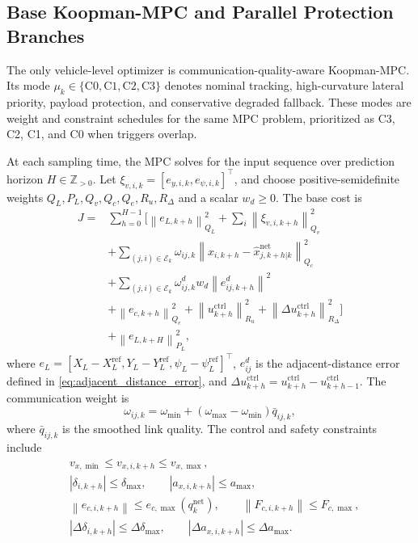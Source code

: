 \documentclass[letterpaper,journal]{IEEEtran}
\newcommand{\norm}[1]{\left\lVert #1 \right\rVert}
\begin{document}
\subsection{Base Koopman-MPC and Parallel Protection Branches}

The only vehicle-level optimizer is communication-quality-aware Koopman-MPC. Its mode $\mu_k\in\{\mathrm{C0},\mathrm{C1},\mathrm{C2},\mathrm{C3}\}$ denotes nominal tracking, high-curvature lateral priority, payload protection, and conservative degraded fallback. These modes are weight and constraint schedules for the same MPC problem, prioritized as C3, C2, C1, and C0 when triggers overlap.

At each sampling time, the MPC solves for the input sequence over prediction horizon $H\in\mathbb Z_{>0}$. Let $\xi_{v,i,k}=[e_{y,i,k},e_{\psi,i,k}]^\top$, and choose positive-semidefinite weights $Q_L,P_L,Q_v,Q_c,Q_e,R_u,R_\Delta$ and a scalar $w_d\ge0$. The base cost is
\begingroup\small
\begin{equation}
\begin{aligned}
J=&\sum_{h=0}^{H-1}
\Big[
\norm{e_{L,k+h}}_{Q_L}^2+
\sum_i\norm{\xi_{v,i,k+h}}_{Q_v}^2\\
&+\sum_{(j,i)\in\mathcal E_k}\omega_{ij,k}\norm{x_{i,k+h}-\hat x_{j,k+h|k}^{\mathrm{net}}}_{Q_c}^2\\
&+\sum_{(j,i)\in\mathcal E_k}\omega^d_{ij,k}w_d\norm{e^d_{ij,k+h}}^2\\
&+\norm{e_{c,k+h}}_{Q_e}^2+
\norm{u_{k+h}^{\mathrm{ctrl}}}_{R_u}^2+
\norm{\Delta u_{k+h}^{\mathrm{ctrl}}}_{R_\Delta}^2
\Big]\\
&+\norm{e_{L,k+H}}_{P_L}^2 ,
\end{aligned}
\label{eq:mpc_cost}
\end{equation}
\endgroup
where $e_L=[X_L-X_L^{\mathrm{ref}},Y_L-Y_L^{\mathrm{ref}},\psi_L-\psi_L^{\mathrm{ref}}]^\top$, $e^d_{ij}$ is the adjacent-distance error defined in \eqref{eq:adjacent_distance_error}, and $\Delta u_{k+h}^{\mathrm{ctrl}}=u_{k+h}^{\mathrm{ctrl}}-u_{k+h-1}^{\mathrm{ctrl}}$. The communication weight is
\begin{equation}
\omega_{ij,k}=\omega_{\min}+(\omega_{\max}-\omega_{\min})\bar q_{ij,k},
\label{eq:comm_weight}
\end{equation}
where $\bar q_{ij,k}$ is the smoothed link quality. The control and safety constraints include
\begingroup\small
\begin{equation}
\begin{aligned}
&v_{x,\min}\le v_{x,i,k+h}\le v_{x,\max},\\
&|\delta_{i,k+h}|\le\delta_{\max},\qquad
|a_{x,i,k+h}|\le a_{\max},\\
&\norm{e_{c,i,k+h}}\le e_{c,\max}(q_k^{\mathrm{net}}),\qquad
\norm{F_{c,i,k+h}}\le F_{c,\max},\\
&|\Delta \delta_{i,k+h}|\le \Delta\delta_{\max},\qquad
|\Delta a_{x,i,k+h}|\le \Delta a_{\max}.
\end{aligned}
\label{eq:constraints}
\end{equation}
\end{document}
